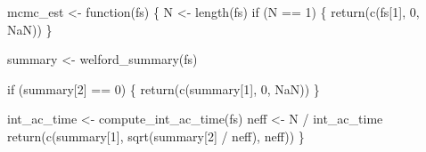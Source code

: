 \documentclass[
  letterpaper,
  DIV=11,
  numbers=noendperiod]{scrartcl}
\newenvironment{Shaded}{\begin{snugshade}}{\end{snugshade}}
\newcommand{\ConstantTok}[1]{\textcolor[rgb]{0.56,0.35,0.01}{#1}}
\newcommand{\ControlFlowTok}[1]{\textcolor[rgb]{0.00,0.23,0.31}{#1}}
\newcommand{\DecValTok}[1]{\textcolor[rgb]{0.68,0.00,0.00}{#1}}
\newcommand{\FunctionTok}[1]{\textcolor[rgb]{0.28,0.35,0.67}{#1}}
\newcommand{\NormalTok}[1]{\textcolor[rgb]{0.00,0.23,0.31}{#1}}
\newcommand{\OtherTok}[1]{\textcolor[rgb]{0.00,0.23,0.31}{#1}}
\newcommand{\SpecialCharTok}[1]{\textcolor[rgb]{0.37,0.37,0.37}{#1}}
\begin{document}
\begin{Shaded}
\begin{Highlighting}[]
\NormalTok{mcmc\_est }\OtherTok{\textless{}{-}} \ControlFlowTok{function}\NormalTok{(fs) \{}
\NormalTok{  N }\OtherTok{\textless{}{-}} \FunctionTok{length}\NormalTok{(fs)}
  \ControlFlowTok{if}\NormalTok{ (N }\SpecialCharTok{==} \DecValTok{1}\NormalTok{) \{}
    \FunctionTok{return}\NormalTok{(}\FunctionTok{c}\NormalTok{(fs[}\DecValTok{1}\NormalTok{], }\DecValTok{0}\NormalTok{, }\ConstantTok{NaN}\NormalTok{))}
\NormalTok{  \}}

\NormalTok{  summary }\OtherTok{\textless{}{-}} \FunctionTok{welford\_summary}\NormalTok{(fs)}

  \ControlFlowTok{if}\NormalTok{ (summary[}\DecValTok{2}\NormalTok{] }\SpecialCharTok{==} \DecValTok{0}\NormalTok{) \{}
    \FunctionTok{return}\NormalTok{(}\FunctionTok{c}\NormalTok{(summary[}\DecValTok{1}\NormalTok{], }\DecValTok{0}\NormalTok{, }\ConstantTok{NaN}\NormalTok{))}
\NormalTok{  \}}

\NormalTok{  int\_ac\_time }\OtherTok{\textless{}{-}} \FunctionTok{compute\_int\_ac\_time}\NormalTok{(fs)}
\NormalTok{  neff }\OtherTok{\textless{}{-}}\NormalTok{ N }\SpecialCharTok{/}\NormalTok{ int\_ac\_time}
  \FunctionTok{return}\NormalTok{(}\FunctionTok{c}\NormalTok{(summary[}\DecValTok{1}\NormalTok{], }\FunctionTok{sqrt}\NormalTok{(summary[}\DecValTok{2}\NormalTok{] }\SpecialCharTok{/}\NormalTok{ neff), neff))}
\NormalTok{\}}
\end{Highlighting}
\end{Shaded}
\end{document}
